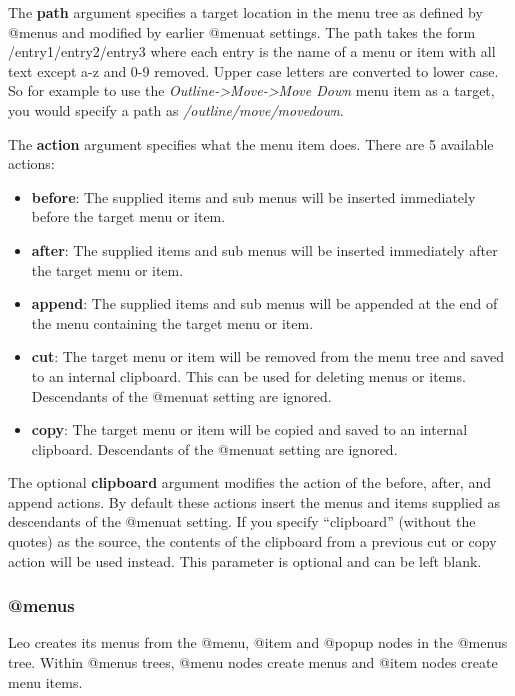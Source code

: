 \documentclass[a4paper,10pt,english]{sphinxmanual}
\begin{document}
The \textbf{path} argument specifies a target location in the menu tree as defined by
@menus and modified by earlier @menuat settings. The path takes the form
/entry1/entry2/entry3 where each entry is the name of a menu or item with all
text except a-z and 0-9 removed. Upper case letters are converted to lower case.
So for example to use the \emph{Outline-\textgreater{}Move-\textgreater{}Move Down} menu item as a target, you
would specify a path as \emph{/outline/move/movedown}.

The \textbf{action} argument specifies what the menu item does.
There are 5 available actions:
\begin{itemize}
\item {} 
\textbf{before}: The supplied items and sub menus will be inserted immediately
before the target menu or item.

\item {} 
\textbf{after}: The supplied items and sub menus will be inserted immediately after
the target menu or item.

\item {} 
\textbf{append}: The supplied items and sub menus will be appended at the end of
the menu containing the target menu or item.

\item {} 
\textbf{cut}: The target menu or item will be removed from the menu tree and saved
to an internal clipboard. This can be used for deleting menus or items.
Descendants of the @menuat setting are ignored.

\item {} 
\textbf{copy}: The target menu or item will be copied and saved to
an internal clipboard.  Descendants of the @menuat setting are ignored.

\end{itemize}

The optional \textbf{clipboard} argument modifies the action of the before, after,
and append actions. By default these actions insert the menus and items supplied
as descendants of the @menuat setting. If you specify ``clipboard'' (without the
quotes) as the source, the contents of the clipboard from a previous cut or copy
action will be used instead. This parameter is optional and can be left blank.


\subsubsection{@menus}
\label{customizing:menus}
Leo creates its menus from the @menu, @item and @popup nodes in the @menus tree.
Within @menus trees, @menu nodes create menus and @item nodes create menu items.
\end{document}
